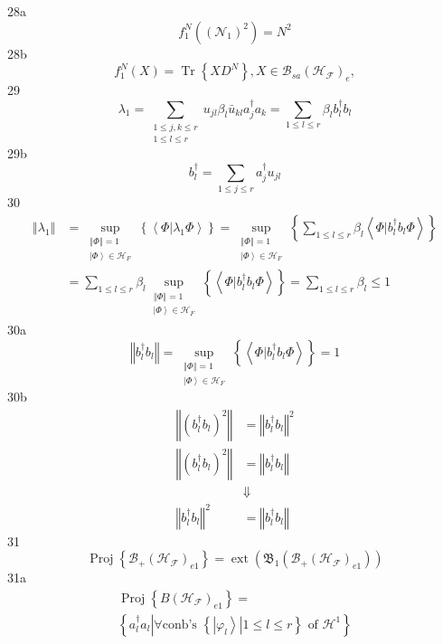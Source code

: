 \documentclass[aps,preprint]{revtex4}%
\begin{document}
28a%
\[
f_{1}^{N}\left(  \left(  \mathcal{N}_{1}\right)  ^{2}\right)  =N^{2}%
\]
28b%
\[
f_{1}^{N}\left(  X\right)  =\operatorname*{Tr}\left\{  XD^{N}\right\}
,X\in\mathcal{B}_{sa}\left(  \mathcal{H}_{\mathcal{F}}\right)  _{e},
\]
29%
\[
\lambda_{1}=\sum_{\substack{1\leq j,k\leq r\\1\leq l\leq r}}u_{jl}\beta
_{l}\bar{u}_{kl}a_{j}^{\dagger}a_{k}=\sum_{1\leq l\leq r}\beta_{l}%
b_{l}^{\dagger}b_{l}%
\]
29b%
\[
b_{l}^{\dagger}=\sum_{1\leq j\leq r}a_{j}^{\dagger}u_{jl}%
\]
30%
\begin{align*}
\left\Vert \lambda_{1}\right\Vert  &  =\sup_{\substack{\left\Vert
\Phi\right\Vert =1\\\left\vert \Phi\right\rangle \in\mathcal{H}_{F}}}\left\{
\left\langle \left.  \Phi\right\vert \lambda_{1}\Phi\right\rangle \right\}
=\sup_{\substack{\left\Vert \Phi\right\Vert =1\\\left\vert \Phi\right\rangle
\in\mathcal{H}_{F}}}\left\{  \sum_{1\leq l\leq r}\beta_{l}\left\langle \left.
\Phi\right\vert b_{l}^{\dagger}b_{l}\Phi\right\rangle \right\}  \\
&  =\sum_{1\leq l\leq r}\beta_{l}\sup_{\substack{\left\Vert \Phi\right\Vert
=1\\\left\vert \Phi\right\rangle \in\mathcal{H}_{F}}}\left\{  \left\langle
\left.  \Phi\right\vert b_{l}^{\dagger}b_{l}\Phi\right\rangle \right\}
=\sum_{1\leq l\leq r}\beta_{l}\leq1
\end{align*}
30a%
\[
\left\Vert b_{l}^{\dagger}b_{l}\right\Vert =\sup_{\substack{\left\Vert
\Phi\right\Vert =1\\\left\vert \Phi\right\rangle \in\mathcal{H}_{F}}}\left\{
\left\langle \left.  \Phi\right\vert b_{l}^{\dagger}b_{l}\Phi\right\rangle
\right\}  =1
\]
30b%
\begin{align*}
\left\Vert \left(  b_{l}^{\dagger}b_{l}\right)  ^{2}\right\Vert  &
=\left\Vert b_{l}^{\dagger}b_{l}\right\Vert ^{2}\\
\left\Vert \left(  b_{l}^{\dagger}b_{l}\right)  ^{2}\right\Vert  &
=\left\Vert b_{l}^{\dagger}b_{l}\right\Vert \\
&  \Downarrow\\
\left\Vert b_{l}^{\dagger}b_{l}\right\Vert ^{2} &  =\left\Vert b_{l}^{\dagger
}b_{l}\right\Vert
\end{align*}
31%
\[
\operatorname*{Proj}\left\{  \mathcal{B}_{+}\left(  \mathcal{H}_{\mathcal{F}%
}\right)  _{e1}\right\}  =\operatorname*{ext}\left(  \mathfrak{B}_{1}\left(
\mathcal{B}_{+}\left(  \mathcal{H}_{\mathcal{F}}\right)  _{e1}\right)
\right)
\]
31a%
\begin{gather*}
\operatorname*{Proj}\left\{  B\left(  \mathcal{H}_{\mathcal{F}}\right)
_{e1}\right\}  =\\
\left\{  \left.  a_{l}^{\dagger}a_{l}\right\vert \forall\text{conb's }\left\{
\left.  \left\vert \varphi_{l}\right\rangle \right\vert 1\leq l\leq r\right\}
\text{ of }\mathcal{H}^{1}\right\}
\end{gather*}
\end{document}
